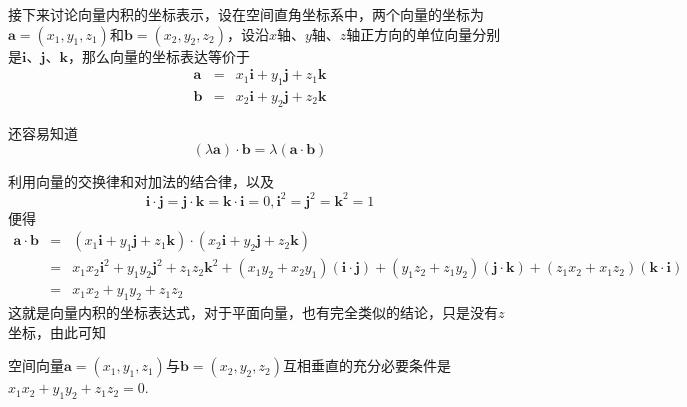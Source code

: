 接下来讨论向量内积的坐标表示，设在空间直角坐标系中，两个向量的坐标为$\bm{a} = (x_1,y_1,z_1)$和$\bm{b}=(x_2,y_2,z_2)$，设沿$x$轴、$y$轴、$z$轴正方向的单位向量分别是$\bm{i}$、$\bm{j}$、$\bm{k}$，那么向量的坐标表达等价于
\begin{eqnarray*}
  \bm{a} & = & x_1 \bm{i} + y_1 \bm{j} + z_1 \bm{k} \\
  \bm{b} & = & x_2 \bm{i} + y_2 \bm{j} + z_2 \bm{k}
\end{eqnarray*}

还容易知道
\[ (\lambda \bm{a}) \cdot \bm{b} = \lambda (\bm{a} \cdot \bm{b}) \]

利用向量的交换律和对加法的结合律，以及
\[ \bm{i} \cdot \bm{j} = \bm{j} \cdot \bm{k} = \bm{k} \cdot \bm{i} = 0, \bm{i}^2 = \bm{j}^2 = \bm{k}^2=1 \]
便得
\begin{eqnarray*}
  \bm{a} \cdot \bm{b} & = & (x_1 \bm{i} + y_1 \bm{j} + z_1 \bm{k}) \cdot (x_2 \bm{i} + y_2 \bm{j} + z_2 \bm{k}) \\
                      & = & x_1x_2 \bm{i}^2 + y_1y_2 \bm{j}^2 + z_1z_2 \bm{k}^2 + (x_1y_2+x_2y_1)(\bm{i} \cdot \bm{j}) + (y_1z_2+z_1y_2)(\bm{j} \cdot \bm{k}) + (z_1x_2 + x_1z_2)(\bm{k} \cdot \bm{i}) \\
  & = & x_1x_2 + y_1y_2+z_1z_2
\end{eqnarray*}
这就是向量内积的坐标表达式，对于平面向量，也有完全类似的结论，只是没有$z$坐标，由此可知

\begin{theorem}
  空间向量$\bm{a}=(x_1,y_1,z_1)$与$\bm{b} = (x_2,y_2,z_2)$互相垂直的充分必要条件是$x_1x_2+y_1y_2+z_1z_2=0$.
\end{theorem}



